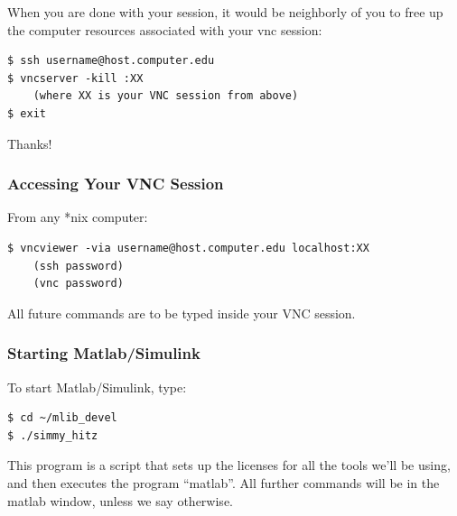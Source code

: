 \documentclass[11pt]{article}
\begin{document}
When you are done with your session, it would be neighborly of you to free up the computer resources associated with your vnc session:
\begin{verbatim}
$ ssh username@host.computer.edu
$ vncserver -kill :XX
    (where XX is your VNC session from above)
$ exit
\end{verbatim}
Thanks!

\subsubsection*{Accessing Your VNC Session}

From any *nix computer:
\begin{verbatim}
$ vncviewer -via username@host.computer.edu localhost:XX
    (ssh password)
    (vnc password)
\end{verbatim}

All future commands are to be typed inside your VNC session.

%

\subsubsection*{Starting Matlab/Simulink}

To start Matlab/Simulink, type:

\begin{verbatim}
$ cd ~/mlib_devel
$ ./simmy_hitz
\end{verbatim}

This program is a script that sets up the licenses for all the tools we'll be
using, and then executes the program ``matlab''.  All further commands will be in
the matlab window, unless we say otherwise.
\end{document}
